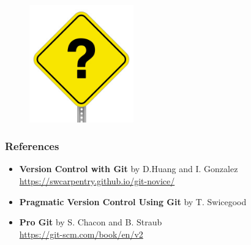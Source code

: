 \documentclass{beamer}
\begin{document}
\begin{frame}
   \frametitle{}
   \vspace{-1.0em}
   \begin{figure}[htbp]
      \includegraphics[width=0.4\textwidth]{images/question-mark-sign.jpg}
   \end{figure}
\end{frame}

\begin{frame}
   \frametitle{References}
    \begin{itemize}
      \setlength\itemsep{1.0em}
      \item \textbf{Version Control with Git} by D.Huang and I. Gonzalez \\ 
         \url{https://swcarpentry.github.io/git-novice/}
      \item \textbf{Pragmatic Version Control Using Git} by T. Swicegood
      \item \textbf{Pro Git} by S. Chacon and B. Straub \\
         \url{https://git-scm.com/book/en/v2}
   \end{itemize}
\end{frame}
\end{document}

